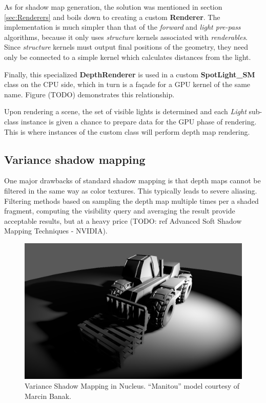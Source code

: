 As for shadow map generation, the solution was mentioned in section \ref{sec:Renderers} and boils down to creating a custom \textbf{Renderer}. The implementation is much simpler than that of the \emph{forward} and \emph{light pre-pass} algorithms, because it only uses \emph{structure} kernels associated with \emph{renderables}. Since \emph{structure} kernels must output final positions of the geometry, they need only be connected to a simple kernel which calculates distances from the light.

Finally, this specialized \textbf{DepthRenderer} is used in a custom \textbf{SpotLight\_SM} class on the CPU side, which in turn is a façade for a GPU kernel of the same name. Figure (TODO) demonstrates this relationship.

Upon rendering a scene, the set of visible lights is determined and each \emph{Light} sub-class instance is given a chance to prepare data for the GPU phase of rendering. This is where instances of the custom class will perform depth map rendering.

\subsection{Variance shadow mapping}

One major drawbacks of standard shadow mapping is that depth maps cannot be filtered in the same way as color textures. This typically leads to severe aliasing. Filtering methods based on sampling the depth map multiple times per a shaded fragment, computing the visibility query and averaging the result provide acceptable results, but at a heavy price (TODO: ref Advanced Soft Shadow Mapping Techniques - NVIDIA).

\begin{figure}[h!]
  \centering
    \includegraphics[width=0.9\linewidth]{./Figures/shadowMapping/manitouVSM.png}
    \caption[VSM in Nucleus]{Variance Shadow Mapping in Nucleus. ``Manitou'' model courtesy of Marcin Banak.}
  \label{fig:NucleusVSM}
\end{figure}

